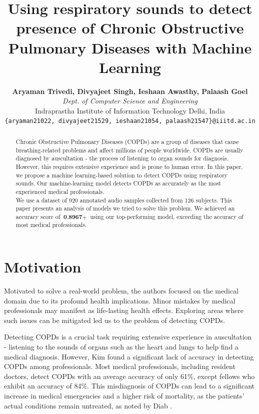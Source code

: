 \documentclass[10pt,twocolumn,letterpaper]{article}
\begin{document}
\title{Using respiratory sounds to detect presence of Chronic Obstructive Pulmonary Diseases with Machine Learning}

\author{\textbf{Aryaman Trivedi, Divyajeet Singh, Ieshaan Awasthy, Palaash Goel}\\
\textit{Dept. of Computer Science and Engineering}\\
Indraprastha Institute of Information Technology Delhi, India\\
{\tt\small \{aryaman21022, divyajeet21529, ieshaan21054, palaash21547\}@iiitd.ac.in}
}


\graphicspath{{Assets/}}

\maketitle


\begin{abstract}
    Chronic Obstructive Pulmonary Diseases (COPDs) are a group of diseases that cause breathing-related problems
    and affect millions of people worldwide. COPDs are
    usually diagnosed by auscultation - the process of listening to organ sounds for diagnosis. However, this requires extensive
    experience and is prone to human error. In this paper, we propose a machine learning-based solution to detect
    COPDs using respiratory sounds. Our machine-learning model detects COPDs as accurately as the most experienced medical professionals. \\
    We use a dataset of 920 annotated audio samples collected from 126 subjects. This paper presents an analysis of models we tried to solve this problem. We achieved an accuracy score of $\textbf{0.8967}+$ using our top-performing model, exceeding the accuracy of most medical professionals.
\end{abstract}

\section{Motivation}

Motivated to solve a real-world problem, the authors focused on the medical domain due to its profound
health implications. Minor mistakes by medical professionals may manifest as life-lasting health effects.
Exploring areas where such issues can be mitigated led us to the problem of detecting COPDs.

Detecting COPDs is a crucial task requiring extensive experience in auscultation - listening to the sounds of
organs such as the heart and lungs to help find a medical diagnosis. However, Kim \etal \cite{kim} found a
significant lack of accuracy in detecting COPDs among professionals. Most medical professionals, including resident doctors, detect COPDs with an
average accuracy of only 61\%, except fellows who exhibit an accuracy of 84\%. This misdiagnosis of COPDs can lead to
a significant increase in medical emergencies and a higher risk of mortality, as the patients' actual
conditions remain untreated, as noted by Diab \etal \cite{diab}.
\end{document}
